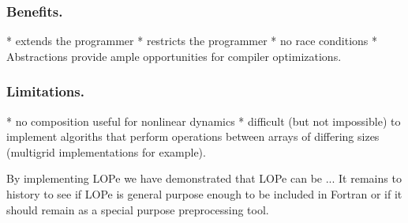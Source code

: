 \subsubsection{Benefits.}
* extends the programmer
* restricts the programmer
* no race conditions
* Abstractions provide ample opportunities for compiler optimizations.

\subsubsection{Limitations.}
* no composition useful for nonlinear dynamics\cite{coella}
* difficult (but not impossible) to implement algoriths that perform operations between arrays of
differing sizes (multigrid implementations for example).

By implementing LOPe
we have demonstrated that LOPe can be ... It remains to history to see if LOPe is general purpose
enough to be included in Fortran or if it should remain as a special purpose preprocessing tool.
